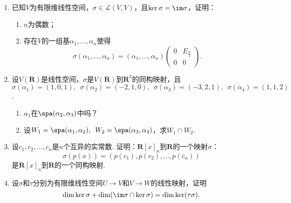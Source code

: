\begin{enumerate}
    \item 已知$V$为有限维线性空间，$\sigma\in \mathcal{L}(V,V)$，且$\ker\sigma=\im \sigma$，证明：
          \begin{enumerate}
              \item $n$为偶数；

              \item 存在$V$的一组基$\alpha_1,\ldots,\alpha_n$使得
                    \[\sigma(\alpha_1,\ldots,\alpha_n)=(\alpha_1,\ldots,\alpha_n)\begin{pmatrix}
                            0 & E_{\frac{n}{2}} \\ 0 & 0
                        \end{pmatrix}.\]
          \end{enumerate}

    \item 设$V(\mathbf{R})$是线性空间，$\sigma$是$V(\mathbf{R})$到$\mathbf{R}^3$的同构映射，且$\sigma(\alpha_1)=(1,0,1),\enspace\allowbreak\sigma(\alpha_2)=(-2,1,0),\enspace\allowbreak\sigma(\alpha_3)=(-3,2,1),\enspace\allowbreak\sigma(\alpha_4)=(1,1,2)$.
          \begin{enumerate}
              \item $\alpha_1$在$\spa(\alpha_2,\alpha_3)$中吗？

              \item 设$W_1=\spa(\alpha_1,\alpha_2),\enspace W_2=\spa(\alpha_3,\alpha_4)$，求$W_1\cap W_2$.
          \end{enumerate}

    \item 设$c_1,c_2,\ldots,c_n$是$n$个互异的实常数. 证明：$\mathbf{R}[x]_n$到$\mathbf{R}$的一个映射$\sigma$：
          \[\sigma(p(x))=(p(c_1),p(c_2),\ldots,p(c_n))\]
          是$\mathbf{R}[x]_n$到$\mathbf{R}$的一个同构映射.

    \item 设$\sigma$和$\tau$分别为有限维线性空间$U\to V$和$V\to W$的线性映射，证明
          \[\dim\ker\sigma+\dim(\im\sigma\cap\ker\sigma)=\dim\ker(\tau\sigma).\]
\end{enumerate}

